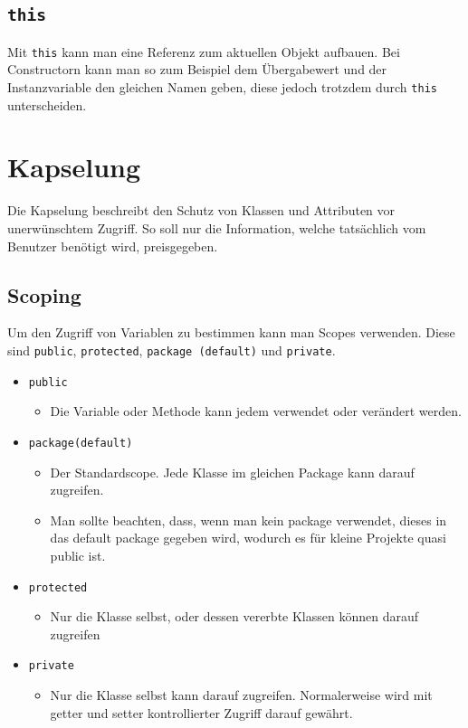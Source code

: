 \documentclass{article}
\begin{document}
	\subsection{\texttt{this}}
	Mit \texttt{this} kann man eine Referenz zum aktuellen Objekt aufbauen. Bei Constructorn kann man so zum Beispiel dem Übergabewert und der Instanzvariable den gleichen Namen geben, diese jedoch trotzdem durch \texttt{this} unterscheiden.
	\section{Kapselung}
	Die Kapselung beschreibt den Schutz von Klassen und Attributen vor unerwünschtem Zugriff. So soll nur die Information, welche tatsächlich vom Benutzer benötigt wird, preisgegeben.
	\subsection{Scoping}
	Um den Zugriff von Variablen zu bestimmen kann man Scopes verwenden. Diese sind \texttt{public}, \texttt{protected}, \texttt{package (default)} und \texttt{private}. \\
	\begin{itemize}
		\item{\texttt{public}}
		\begin{itemize}
			\item{Die Variable oder Methode kann jedem verwendet oder verändert werden.}
		\end{itemize}
		\item{\texttt{package(default)}}
		\begin{itemize}
			\item{Der Standardscope. Jede Klasse im gleichen Package kann darauf zugreifen.}
			\item{Man sollte beachten, dass, wenn man kein package verwendet, dieses in das default package gegeben wird, wodurch es für kleine Projekte quasi public ist.}
		\end{itemize}
		\item{\texttt{protected}}
		\begin{itemize}
			\item{Nur die Klasse selbst, oder dessen vererbte Klassen können darauf zugreifen}
		\end{itemize}
		\item{\texttt{private}}
		\begin{itemize}
			\item{Nur die Klasse selbst kann darauf zugreifen. Normalerweise wird mit getter und setter kontrollierter Zugriff darauf gewährt.}
		\end{itemize}
	\end{itemize}
\end{document}
